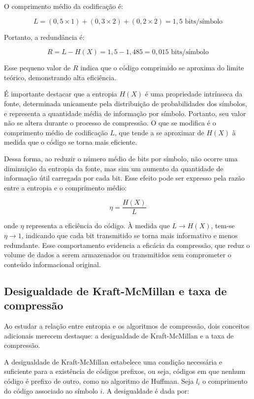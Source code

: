 O comprimento médio da codificação é:

\[
L = (0{,}5 \times 1) + (0{,}3 \times 2) + (0{,}2 \times 2) = 1{,}5 \text{ bits/símbolo}
\]

Portanto, a redundância é:

\[
R = L - H(X) = 1{,}5 - 1{,}485 = 0{,}015 \text{ bits/símbolo}
\]

Esse pequeno valor de \( R \) indica que o código comprimido se aproxima do limite teórico, demonstrando alta eficiência.


É importante destacar que a entropia \( H(X) \) é uma propriedade intrínseca da fonte, determinada unicamente pela distribuição de probabilidades dos símbolos, e representa a quantidade média de informação por símbolo. Portanto, seu valor não se altera durante o processo de compressão. O que se modifica é o comprimento médio de codificação \( L \), que tende a se aproximar de \( H(X) \) à medida que o código se torna mais eficiente.

Dessa forma, ao reduzir o número médio de bits por símbolo, não ocorre uma diminuição da entropia da fonte, mas sim um aumento da quantidade de informação útil carregada por cada bit. Esse efeito pode ser expresso pela razão entre a entropia e o comprimento médio:

\[
\eta = \frac{H(X)}{L}
\]

onde \( \eta \) representa a eficiência do código. À medida que \( L \to H(X) \), tem-se \( \eta \to 1 \), indicando que cada bit transmitido se torna mais informativo e menos redundante. Esse comportamento evidencia a eficácia da compressão, que reduz o volume de dados a serem armazenados ou transmitidos sem comprometer o conteúdo informacional original.

\subsection{Desigualdade de Kraft-McMillan e taxa de compressão}

Ao estudar a relação entre entropia e os algoritmos de compressão, dois conceitos adicionais merecem destaque: a desigualdade de Kraft-McMillan e a taxa de compressão.  

A desigualdade de Kraft-McMillan estabelece uma condição necessária e suficiente para a existência de códigos prefixos,
  ou seja, códigos em que nenhum código é prefixo de outro, como no algoritmo de Huffman. Seja $l_i$ o comprimento do código associado ao símbolo $i$. A desigualdade é dada por:

